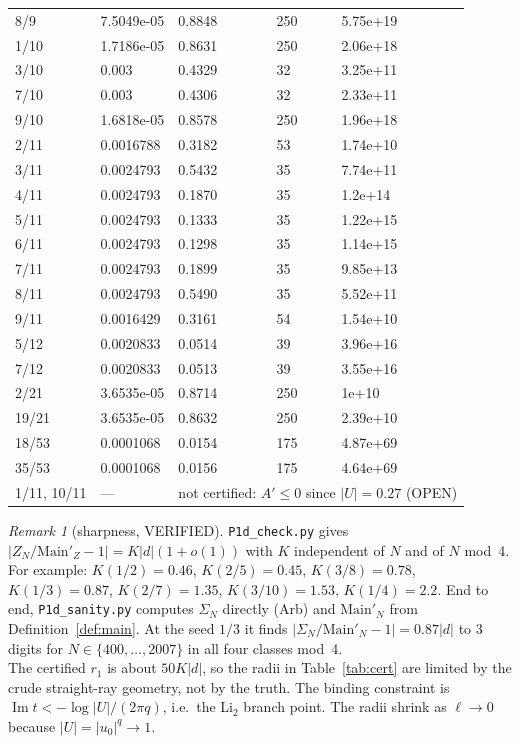 \documentclass[11pt]{article}
\theoremstyle{definition}\newtheorem{definition}[theorem]{Definition}
\theoremstyle{remark}\newtheorem{remark}[theorem]{Remark}
\begin{document}
\begin{table}[h]
\begin{tabular}{lllll}
8/9 & 7.5049e-05 & 0.8848 & 250 & 5.75e+19\\
1/10 & 1.7186e-05 & 0.8631 & 250 & 2.06e+18\\
3/10 & 0.003 & 0.4329 & 32 & 3.25e+11\\
7/10 & 0.003 & 0.4306 & 32 & 2.33e+11\\
9/10 & 1.6818e-05 & 0.8578 & 250 & 1.96e+18\\
2/11 & 0.0016788 & 0.3182 & 53 & 1.74e+10\\
3/11 & 0.0024793 & 0.5432 & 35 & 7.74e+11\\
4/11 & 0.0024793 & 0.1870 & 35 & 1.2e+14\\
5/11 & 0.0024793 & 0.1333 & 35 & 1.22e+15\\
6/11 & 0.0024793 & 0.1298 & 35 & 1.14e+15\\
7/11 & 0.0024793 & 0.1899 & 35 & 9.85e+13\\
8/11 & 0.0024793 & 0.5490 & 35 & 5.52e+11\\
9/11 & 0.0016429 & 0.3161 & 54 & 1.54e+10\\
5/12 & 0.0020833 & 0.0514 & 39 & 3.96e+16\\
7/12 & 0.0020833 & 0.0513 & 39 & 3.55e+16\\
2/21 & 3.6535e-05 & 0.8714 & 250 & 1e+10\\
19/21 & 3.6535e-05 & 0.8632 & 250 & 2.39e+10\\
18/53 & 0.0001068 & 0.0154 & 175 & 4.87e+69\\
35/53 & 0.0001068 & 0.0156 & 175 & 4.64e+69\\
1/11, 10/11 & --- & \multicolumn{3}{l}{not certified: $A'\le0$ since $|U|=0.27$ (OPEN)}\\
\bottomrule\end{tabular}
\end{table}

\begin{remark}[sharpness, VERIFIED]
\texttt{P1d\_check.py} gives $|Z_N/\mathrm{Main}'_Z-1|=K|d|(1+o(1))$ with $K$ independent of $N$ and of $N$ mod~4. For example: $K(1/2)=0.46$, $K(2/5)=0.45$, $K(3/8)=0.78$, $K(1/3)=0.87$, $K(2/7)=1.35$, $K(3/10)=1.53$, $K(1/4)=2.2$.
End to end, \texttt{P1d\_sanity.py} computes $\Sigma_N$ directly (Arb) and $\mathrm{Main}'_N$ from Definition~\ref{def:main}. At the seed $1/3$ it finds $|\Sigma_N/\mathrm{Main}'_N-1|=0.87|d|$ to 3 digits for $N\in\{400,\dots,2007\}$ in all four classes mod~4.\\ The certified $r_1$ is about $50K|d|$, so the radii in Table~\ref{tab:cert} are limited by the crude straight-ray geometry, not by the truth. The binding constraint is $\operatorname{Im}t<-\log|U|/(2\pi q)$, i.e.\ the Li$_2$ branch point.
The radii shrink as $\ell\to0$ because $|U|=|u_0|^q\to1$.
\end{remark}
\end{document}

